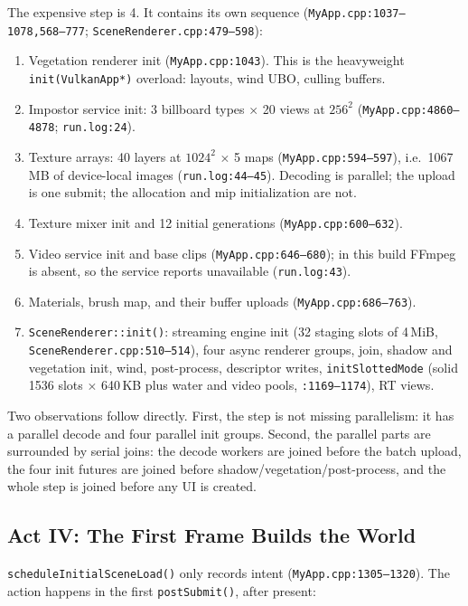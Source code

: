 \documentclass[11pt,a4paper]{article}
\begin{document}
The expensive step is 4. It contains its own sequence
(\texttt{MyApp.cpp:1037--1078,568--777};
\texttt{SceneRenderer.cpp:479--598}):

\begin{enumerate}[leftmargin=1.5em,itemsep=2pt]
\item Vegetation renderer init (\texttt{MyApp.cpp:1043}). This is the
heavyweight \texttt{init(VulkanApp*)} overload: layouts, wind UBO, culling
buffers.
\item Impostor service init: 3 billboard types $\times$ 20 views at
$256^2$ (\texttt{MyApp.cpp:4860--4878}; \texttt{run.log:24}).
\item Texture arrays: 40 layers at $1024^2$ $\times$ 5 maps
(\texttt{MyApp.cpp:594--597}), i.e.\ 1067\,MB of device-local images
(\texttt{run.log:44--45}). Decoding is parallel; the upload is one submit;
the allocation and mip initialization are not.
\item Texture mixer init and 12 initial generations
(\texttt{MyApp.cpp:600--632}).
\item Video service init and base clips (\texttt{MyApp.cpp:646--680}); in
this build FFmpeg is absent, so the service reports unavailable
(\texttt{run.log:43}).
\item Materials, brush map, and their buffer uploads
(\texttt{MyApp.cpp:686--763}).
\item \texttt{SceneRenderer::init()}: streaming engine init (32 staging slots
of 4\,MiB, \texttt{SceneRenderer.cpp:510--514}), four async renderer groups,
join, shadow and vegetation init, wind, post-process, descriptor writes,
\texttt{initSlottedMode} (solid 1536 slots $\times$ 640\,KB plus water and
video pools, \texttt{:1169--1174}), RT views.
\end{enumerate}

Two observations follow directly. First, the step is not missing
parallelism: it has a parallel decode and four parallel init groups. Second,
the parallel parts are surrounded by serial joins: the decode workers are
joined before the batch upload, the four init futures are joined before
shadow/vegetation/post-process, and the whole step is joined before any UI is
created.

\subsection{Act IV: The First Frame Builds the World}

\texttt{scheduleInitialSceneLoad()} only records intent
(\texttt{MyApp.cpp:1305--1320}). The action happens in the first
\texttt{postSubmit()}, after present:
\end{document}
